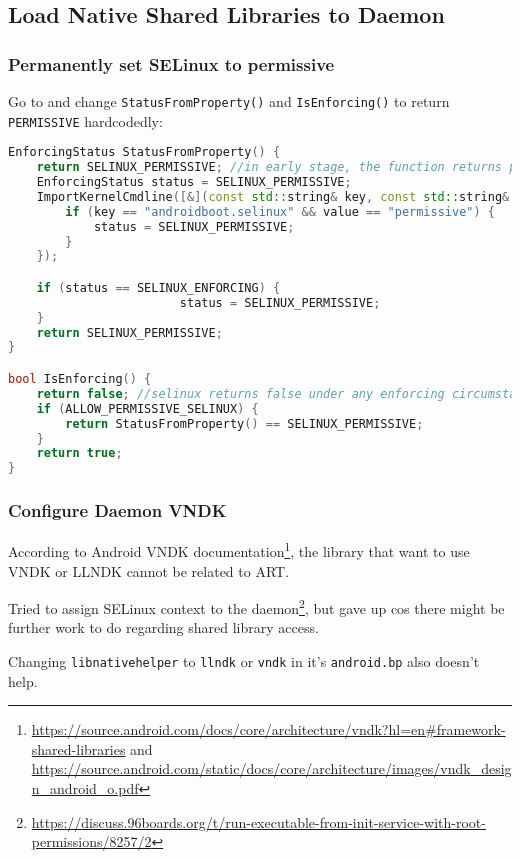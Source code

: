 \subsection{Load Native Shared Libraries to Daemon}
\label{task:20230103_aosp}

\subsubsection{Permanently set SELinux to permissive}

Go to  and change \texttt{StatusFromProperty()} and \texttt{IsEnforcing()} to return \texttt{PERMISSIVE} hardcodedly:
\begin{lstlisting}[language=C++]
EnforcingStatus StatusFromProperty() {
    return SELINUX_PERMISSIVE; //in early stage, the function returns permissive status
    EnforcingStatus status = SELINUX_PERMISSIVE;
    ImportKernelCmdline([&](const std::string& key, const std::string& value) {
        if (key == "androidboot.selinux" && value == "permissive") {
            status = SELINUX_PERMISSIVE;
        }
    });

    if (status == SELINUX_ENFORCING) {
                        status = SELINUX_PERMISSIVE;
    }
    return SELINUX_PERMISSIVE;
}

bool IsEnforcing() {
    return false; //selinux returns false under any enforcing circumstances. 
    if (ALLOW_PERMISSIVE_SELINUX) {
        return StatusFromProperty() == SELINUX_PERMISSIVE;
    }
    return true;
}
\end{lstlisting}

\subsubsection{Configure Daemon VNDK}

According to Android VNDK documentation\footnote{\url{https://source.android.com/docs/core/architecture/vndk?hl=en\#framework-shared-libraries} and \url{https://source.android.com/static/docs/core/architecture/images/vndk_design_android_o.pdf}}, the library that want to use VNDK or LLNDK cannot be related to ART. 

Tried to assign SELinux context to the daemon\footnote{\url{https://discuss.96boards.org/t/run-executable-from-init-service-with-root-permissions/8257/2}}, but gave up cos there might be further work to do regarding shared library access.

Changing \texttt{libnativehelper} to \texttt{llndk} or \texttt{vndk} in it's \texttt{android.bp} also doesn't help.

